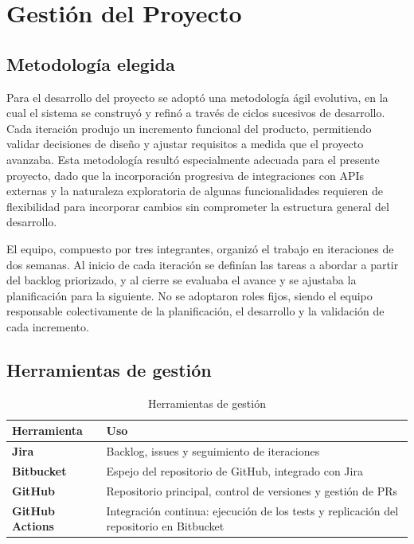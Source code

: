 \chapter{Gestión del Proyecto}

\section{Metodología elegida}
Para el desarrollo del proyecto se adoptó una metodología ágil evolutiva, en la cual el sistema se construyó y refinó a través de ciclos sucesivos de desarrollo. Cada iteración produjo un incremento funcional del producto, permitiendo validar decisiones de diseño y ajustar requisitos a medida que el proyecto avanzaba. Esta metodología resultó especialmente adecuada para el presente proyecto, dado que la incorporación progresiva de integraciones con APIs externas y la naturaleza exploratoria de algunas funcionalidades requieren de flexibilidad para incorporar cambios sin comprometer la estructura general del desarrollo.

El equipo, compuesto por tres integrantes, organizó el trabajo en iteraciones de dos semanas. Al inicio de cada iteración se definían las tareas a abordar a partir del backlog priorizado, y al cierre se evaluaba el avance y se ajustaba la planificación para la siguiente. No se adoptaron roles fijos, siendo el equipo responsable colectivamente de la planificación, el desarrollo y la validación de cada incremento.

\section{Herramientas de gestión}
\begin{table}[H]
  \centering
  \renewcommand{\arraystretch}{1.25}
  \begin{tabularx}{\textwidth}{>{\bfseries}l X}
    \toprule
    Herramienta & Uso \\
    \midrule
    Jira & Backlog, issues y seguimiento de iteraciones \\
    Bitbucket & Espejo del repositorio de GitHub, integrado con Jira \\
    GitHub & Repositorio principal, control de versiones y gestión de PRs \\
    GitHub Actions & Integración continua: ejecución de los tests y replicación del repositorio en Bitbucket \\
    \bottomrule
  \end{tabularx}
  \caption{Herramientas de gestión}
  \label{tab:herramientas_gestion}
\end{table}

